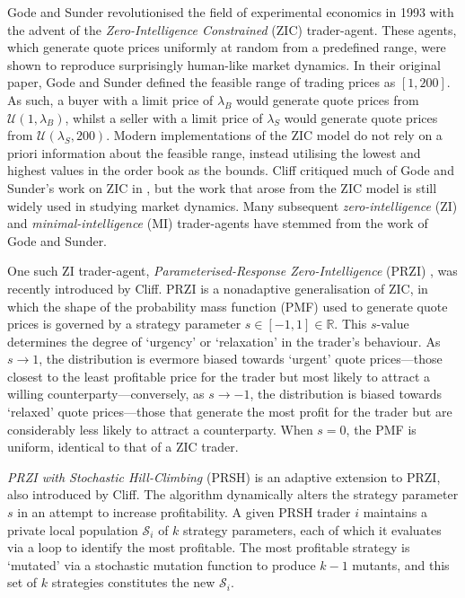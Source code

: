 \documentclass[a4paper,twoside]{article}
\begin{document}
Gode and Sunder \cite{GodeSunder} revolutionised the field of experimental economics in 1993 with the advent of the \textit{Zero-Intelligence Constrained} (ZIC) trader-agent.
These agents, which generate quote prices uniformly at random from a predefined range, were shown to reproduce surprisingly human-like market dynamics.
In their original paper, Gode and Sunder defined the feasible range of trading prices as $[1,  200]$.
As such, a buyer with a limit price of $\lambda_B$ would generate quote prices from $\mathcal{U}(1, \lambda_B)$, whilst a seller with a limit price of $\lambda_S$ would generate quote prices from $\mathcal{U}(\lambda_S, 200)$.
Modern implementations of the ZIC model do not rely on a priori information about the feasible range, instead utilising the lowest and highest values in the order book as the bounds.
Cliff critiqued much of Gode and Sunder's work on ZIC in \cite{ZIP}, but the work that arose from the ZIC model is still widely used in studying market dynamics.
Many subsequent \textit{zero-intelligence} (ZI) and \textit{minimal-intelligence} (MI) trader-agents have stemmed from the work of Gode and Sunder.

One such ZI trader-agent, \textit{Parameterised-Response Zero-Intelligence} (PRZI) \cite{PRZI}, was recently introduced by Cliff.
PRZI is a nonadaptive generalisation of ZIC, in which the shape of the probability mass function (PMF) used to generate quote prices is governed by a strategy parameter $s\in[-1, 1]\in\mathbb{R}$.
This $s$-value determines the degree of `urgency' or `relaxation' in the trader's behaviour.
As $s\to1$, the distribution is evermore biased towards `urgent' quote prices---those closest to the least profitable price for the trader but most likely to attract a willing counterparty---conversely, as $s\to-1$, the distribution is biased towards `relaxed' quote prices---those that generate the most profit for the trader but are considerably less likely to attract a counterparty.
When $s=0$, the PMF is uniform, identical to that of a ZIC trader.

\textit{PRZI with Stochastic Hill-Climbing} (PRSH) \cite{PRSH} is an adaptive extension to PRZI, also introduced by Cliff.
The algorithm dynamically alters the strategy parameter $s$ in an attempt to increase profitability.
A given PRSH trader $i$ maintains a private local population $\mathcal{S}_i$ of $k$ strategy parameters, each of which it evaluates via a loop to identify the most profitable.
The most profitable strategy is `mutated' via a stochastic mutation function to produce $k-1$ mutants, and this set of $k$ strategies constitutes the new $\mathcal{S}_i$.
\end{document}
